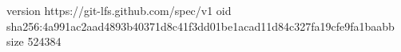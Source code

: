 version https://git-lfs.github.com/spec/v1
oid sha256:4a991ac2aad4893b40371d8c41f3dd01be1acad11d84c327fa19cfe9fa1baabb
size 524384
